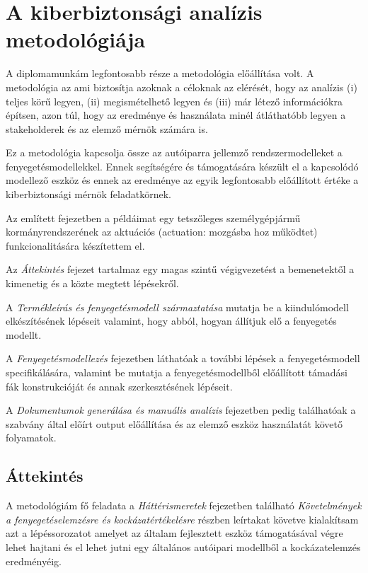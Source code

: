 \chapter{A kiberbiztonsági analízis metodológiája}

A diplomamunkám legfontosabb része a metodológia előállítása volt. A metodológia az ami biztosítja azoknak a céloknak az elérését, hogy az analízis (i) teljes körű legyen, (ii) megismételhető legyen és (iii) már létező információkra építsen, azon túl, hogy az eredménye és használata minél átláthatóbb legyen a stakeholderek és az elemző mérnök számára is.

Ez a metodológia kapcsolja össze az autóiparra jellemző rendszermodelleket a fenyegetésmodellekkel. Ennek segítségére és támogatására készült el a kapcsolódó modellező eszköz és ennek az eredménye az egyik legfontosabb előállított értéke a kiberbiztonsági mérnök feladatkörnek.

Az említett fejezetben a példáimat egy tetszőleges személygépjármű kormányrendszerének az aktuációs (actuation: mozgásba hoz működtet) funkcionalitására készítettem el. 

Az \textit{Áttekintés} fejezet tartalmaz egy magas szintű végigvezetést a bemenetektől a kimenetig és a közte megtett lépésekről.

A \textit{Termékleírás és fenyegetésmodell származtatása} mutatja be a kiindulómodell elkészítésének lépéseit valamint, hogy abból, hogyan állítjuk elő a fenyegetés modellt.

A \textit{Fenyegetésmodellezés} fejezetben láthatóak a további lépések a fenyegetésmodell specifikálására, valamint be mutatja a fenyegetésmodellből előállított támadási fák konstrukcióját és annak szerkesztésének lépéseit.

A \textit{Dokumentumok generálása és manuális analízis} fejezetben pedig találhatóak a szabvány által előírt output előállítása és az elemző eszköz használatát követő folyamatok.

\section{Áttekintés}

A metodológiám fő feladata a \textit{Háttérismeretek} fejezetben található \textit{Követelmények a fenyegetéselemzésre és kockázatértékelésre} részben leírtakat követve kialakítsam azt a lépéssorozatot amelyet az általam fejlesztett eszköz támogatásával végre lehet hajtani és el lehet jutni egy általános autóipari modellből a kockázatelemzés eredményéig.

